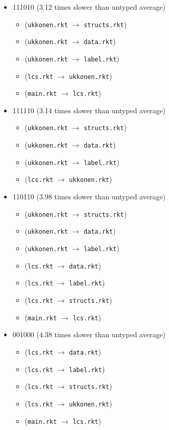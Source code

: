 \documentclass{article}
\newcommand{\mono}[1]{\texttt{#1}}
\begin{document}
\begin{itemize}
\begin{itemize}
  \end{itemize}
\item 111010 (3.12 times slower than untyped average)
  \begin{itemize}
  \item (\mono{ukkonen.rkt} $\rightarrow$ \mono{structs.rkt})
  \item (\mono{ukkonen.rkt} $\rightarrow$ \mono{data.rkt})
  \item (\mono{ukkonen.rkt} $\rightarrow$ \mono{label.rkt})
  \item (\mono{lcs.rkt} $\rightarrow$ \mono{ukkonen.rkt})
  \item (\mono{main.rkt} $\rightarrow$ \mono{lcs.rkt})
  \end{itemize}
\item 111110 (3.14 times slower than untyped average)
  \begin{itemize}
  \item (\mono{ukkonen.rkt} $\rightarrow$ \mono{structs.rkt})
  \item (\mono{ukkonen.rkt} $\rightarrow$ \mono{data.rkt})
  \item (\mono{ukkonen.rkt} $\rightarrow$ \mono{label.rkt})
  \item (\mono{lcs.rkt} $\rightarrow$ \mono{ukkonen.rkt})
  \end{itemize}
\item 110110 (3.98 times slower than untyped average)
  \begin{itemize}
  \item (\mono{ukkonen.rkt} $\rightarrow$ \mono{structs.rkt})
  \item (\mono{ukkonen.rkt} $\rightarrow$ \mono{data.rkt})
  \item (\mono{ukkonen.rkt} $\rightarrow$ \mono{label.rkt})
  \item (\mono{lcs.rkt} $\rightarrow$ \mono{data.rkt})
  \item (\mono{lcs.rkt} $\rightarrow$ \mono{label.rkt})
  \item (\mono{lcs.rkt} $\rightarrow$ \mono{structs.rkt})
  \item (\mono{main.rkt} $\rightarrow$ \mono{lcs.rkt})
  \end{itemize}
\item 001000 (4.38 times slower than untyped average)
  \begin{itemize}
  \item (\mono{lcs.rkt} $\rightarrow$ \mono{data.rkt})
  \item (\mono{lcs.rkt} $\rightarrow$ \mono{label.rkt})
  \item (\mono{lcs.rkt} $\rightarrow$ \mono{structs.rkt})
  \item (\mono{lcs.rkt} $\rightarrow$ \mono{ukkonen.rkt})
  \item (\mono{main.rkt} $\rightarrow$ \mono{lcs.rkt})
  \end{itemize}


\end{itemize}
\end{document}
